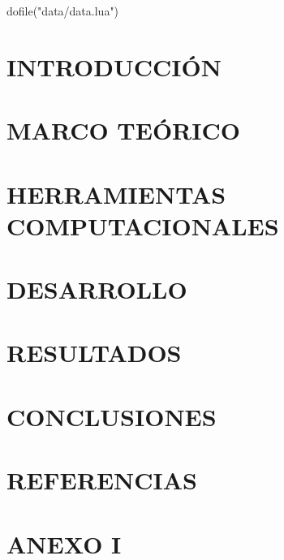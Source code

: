 \documentclass[oneside,a4paper,spanish,links,12pt]{book}
\begin{document}
\begin{luacode}
dofile("data/data.lua")
\end{luacode}



\tableofcontents \pagebreak
\listoffigures \pagebreak
\listoftables \pagebreak
 \printnomenclature \pagebreak


\chapter{INTRODUCCIÓN}\label{capitulo:INTRODUCCION}
 \pagebreak

\chapter{MARCO TEÓRICO}\label{capitulo:MARCO_TEORICO}
 \pagebreak

\chapter{HERRAMIENTAS COMPUTACIONALES}\label{capitulo:HERRAMIENTAS_COMPUTACIONALES}
 \pagebreak

\chapter{DESARROLLO}\label{capitulo:DESARROLLO}
 \pagebreak

\chapter{RESULTADOS}\label{capitulo:RESULTADOS}
 \pagebreak

\chapter{CONCLUSIONES}\label{capitulo:CONCLUSIONES}
 \pagebreak

\chapter{REFERENCIAS}
\printbibliography[heading=none] \pagebreak

\chapter{ANEXO I}
 \pagebreak
\end{document}

